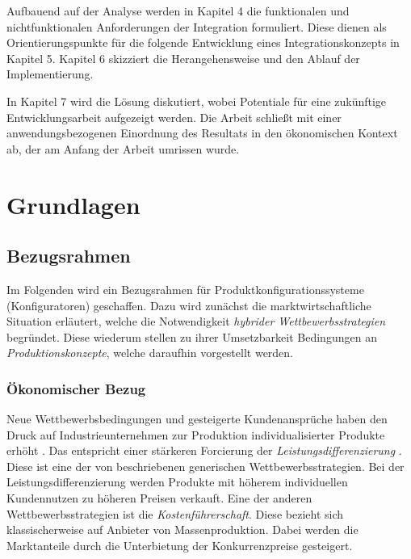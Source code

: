 \documentclass[11pt, a4paper, titlepage, listof=totoc, bibliography=totoc, index=totoc, twoside, openright, headings=normal, draft]{scrreprt}
\begin{document}
Aufbauend auf der Analyse werden in Kapitel 4 die funktionalen und nichtfunktionalen Anforderungen der Integration formuliert. Diese dienen als Orientierungspunkte für die folgende Entwicklung eines Integrationskonzepts in Kapitel 5. Kapitel 6 skizziert die Herangehensweise und den Ablauf der Implementierung.

In Kapitel 7 wird die Lösung diskutiert, wobei Potentiale für eine zukünftige Entwicklungsarbeit aufgezeigt werden. Die Arbeit schließt mit einer anwendungsbezogenen Einordnung des Resultats in den ökonomischen Kontext ab, der am Anfang der Arbeit umrissen wurde.


\pagebreak

\chapter{Grundlagen}
\label{Grundlagen}
\section{Bezugsrahmen}
Im Folgenden wird ein Bezugsrahmen für Produktkonfigurationssysteme (Konfiguratoren) geschaffen. Dazu wird zunächst die marktwirtschaftliche Situation erläutert, welche die Notwendigkeit \emph{hybrider Wettbewerbsstrategien} begründet. Diese wiederum stellen zu ihrer Umsetzbarkeit Bedingungen an \emph{Produktionskonzepte}, welche daraufhin vorgestellt werden.

\subsection{Ökonomischer Bezug}
\label{oekonomischerBezug}
Neue Wettbewerbsbedingungen und gesteigerte Kundenansprüche haben den Druck auf Industrieunternehmen zur Produktion individualisierter Produkte erhöht \citep{piller98}. Das entspricht einer stärkeren Forcierung der \emph{Leistungsdifferenzierung} \citep{lutz11}. Diese ist eine der von \citet{porter02} beschriebenen \glqq generischen Wettbewerbsstrategien\grqq{}. Bei der Leistungsdifferenzierung werden Produkte mit höherem individuellen Kundennutzen zu höheren Preisen verkauft. Eine der anderen Wettbewerbsstrategien ist die \emph{Kostenführerschaft}. Diese bezieht sich klassischerweise auf Anbieter von Massenproduktion. Dabei werden die Marktanteile durch die Unterbietung der Konkurrenzpreise gesteigert.
\end{document}
